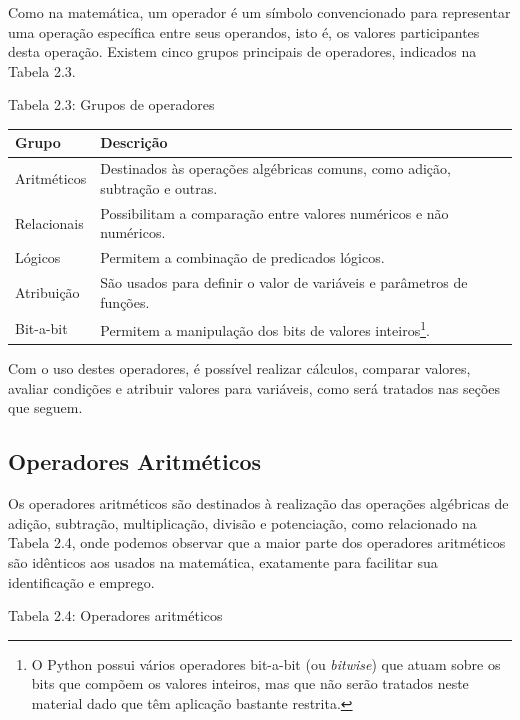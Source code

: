 \documentclass[
]{book}
\begin{document}
Como na matemática, um operador é um símbolo convencionado para representar uma operação específica entre seus operandos, isto é, os valores participantes desta operação. Existem cinco grupos principais de operadores, indicados na Tabela 2.3.

Tabela 2.3: Grupos de operadores

\begin{longtable}[]{@{}
  >{\raggedright\arraybackslash}p{}
  >{\raggedright\arraybackslash}p{}@{}}
\toprule
Grupo & Descrição \\
\midrule
\endhead
Aritméticos & Destinados às operações algébricas comuns, como adição, subtração e outras. \\
Relacionais & Possibilitam a comparação entre valores numéricos e não numéricos. \\
Lógicos & Permitem a combinação de predicados lógicos. \\
Atribuição & São usados para definir o valor de variáveis e parâmetros de funções. \\
Bit-a-bit & Permitem a manipulação dos bits de valores inteiros\footnote{O Python possui vários operadores bit-a-bit (ou \emph{bitwise}) que atuam sobre os bits que compõem os valores inteiros, mas que não serão tratados neste material dado que têm aplicação bastante restrita.}. \\
\bottomrule
\end{longtable}

Com o uso destes operadores, é possível realizar cálculos, comparar valores, avaliar condições e atribuir valores para variáveis, como será tratados nas seções que seguem.

\hypertarget{comput-opera-aritm}{%
\subsection{Operadores Aritméticos}\label{comput-opera-aritm}}

Os operadores aritméticos são destinados à realização das operações algébricas de adição, subtração, multiplicação, divisão e potenciação, como relacionado na Tabela 2.4, onde podemos observar que a maior parte dos operadores aritméticos são idênticos aos usados na matemática, exatamente para facilitar sua identificação e emprego.

Tabela 2.4: Operadores aritméticos
\end{document}
